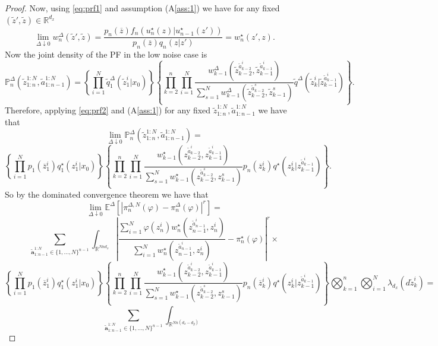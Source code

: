 \documentclass[english,13pt]{article}
\numberwithin{equation}{section}
\begin{document}
\begin{proof}
Now,  using \eqref{eq:prf1} and assumption (A\ref{ass:1}) we have for any fixed $(\widetilde{z}',\widetilde{z})\in\mathbb{R}^{d_x}$
\begin{equation}\label{eq:prf2}
\lim_{\Delta\downarrow 0} w_n^{\Delta}(\widetilde{z}',\widetilde{z}) = 
\frac{p_n(\overline{z})f_n(u_n^{\star}(z)|u_{n-1}^{\star}(z'))}
{p_n(\overline{z})q_n(z|z')} = w_n^{\star}(z',z).
\end{equation}
Now the joint density of the PF in the low noise case is
$$
\mathbb{P}^{\Delta}_n(\widetilde{z}_{1:n}^{1:N},\widetilde{a}_{1:n-1}^{1:N})
= \left\{\prod_{i=1}^N \widetilde{q}_1^{\Delta}(\widetilde{z}_1^i|x_0)\right\}\left\{
\prod_{k=2}^n \prod_{i=1}^N \frac{w_{k-1}^{\Delta}(\widetilde{z}_{k-2}^{\widetilde{a}_{k-2}^i},\widetilde{z}_{k-1}^{\widetilde{a}_{k-1}^i})}{
\sum_{s=1}^N
w_{k-1}^{\Delta}(\widetilde{z}_{k-2}^{\widetilde{a}_{k-2}^s},\widetilde{z}_{k-1}^{s})}
\widetilde{q}^{\Delta}(\widetilde{z}_k^i|\widetilde{z}_{k-1}^{\widetilde{a}_{k-1}^i})
\right\}.
$$
Therefore,  applying \eqref{eq:prf2} and (A\ref{ass:1}) for any fixed $\widetilde{z}_{1:n}^{1:N},\widetilde{a}_{1:n-1}^{1:N}$ we have that
$$
\lim_{\Delta\downarrow 0} \mathbb{P}^{\Delta}_n(\widetilde{z}_{1:n}^{1:N},\widetilde{a}_{1:n-1}^{1:N}) = 
$$
$$
\left\{\prod_{i=1}^N p_1(\overline{z}_1^i)q_1^{\star}(z_1^i|x_0)\right\}\left\{
\prod_{k=2}^n \prod_{i=1}^N \frac{w_{k-1}^{\star}(z_{k-2}^{\widetilde{a}_{k-2}^i},z_{k-1}^{\widetilde{a}_{k-1}^i})}{
\sum_{s=1}^N
w_{k-1}^{\star}(z_{k-2}^{\widetilde{a}_{k-2}^s},z_{k-1}^{s})}
p_n(\overline{z}_k^i) q^{\star}(z_k^i|z_{k-1}^{\widetilde{a}_{k-1}^i})
\right\}.
$$
So by the dominated convergence theorem we have that
$$
\lim_{\Delta \downarrow 0}\mathbb{E}^{\Delta}\left[\left|\pi_n^{\Delta,N}(\varphi)-\pi_n^{\Delta}(\varphi)\right|^r\right] = 
$$
$$
\sum_{\widetilde{\mathbf{a}}_{1:n-1}^{1:N}\in\{1,\dots,N\}^{n-1}} \int_{\mathbb{R}^{Nnd_x}}
\left|
\frac{\sum_{i=1}^N \varphi(z_n^i)
w_{n}^{\star}(z_{n-1}^{\widetilde{a}_{n-1}^i},z_{n}^{i})}
{\sum_{i=1}^N
w_{n}^{\star}(z_{n-1}^{\widetilde{a}_{n-1}^i},z_{n}^{i})}
-\pi_n^{\star}(\varphi)
\right|^{r} \times
$$
$$
\left\{\prod_{i=1}^N p_1(\overline{z}_1^i)q_1^{\star}(z_1^i|x_0)\right\}\left\{
\prod_{k=2}^n \prod_{i=1}^N \frac{w_{k-1}^{\star}(z_{k-2}^{\widetilde{a}_{k-2}^i},z_{k-1}^{\widetilde{a}_{k-1}^i})}{
\sum_{s=1}^N
w_{k-1}^{\star}(z_{k-2}^{\widetilde{a}_{k-2}^s},z_{k-1}^{s})}
p_n(\overline{z}_k^i) q^{\star}(z_k^i|z_{k-1}^{\widetilde{a}_{k-1}^i})
\right\}
\bigotimes_{k=1}^n\bigotimes_{i=1}^N \lambda_{d_x}(d\widetilde{z}^i_k) = 
$$
$$
\sum_{\widetilde{\mathbf{a}}_{1:n-1}^{1:N}\in\{1,\dots,N\}^{n-1}} \int_{\mathbb{R}^{Nn(d_x-d_y)}}
$$
\end{proof}
\end{document}
